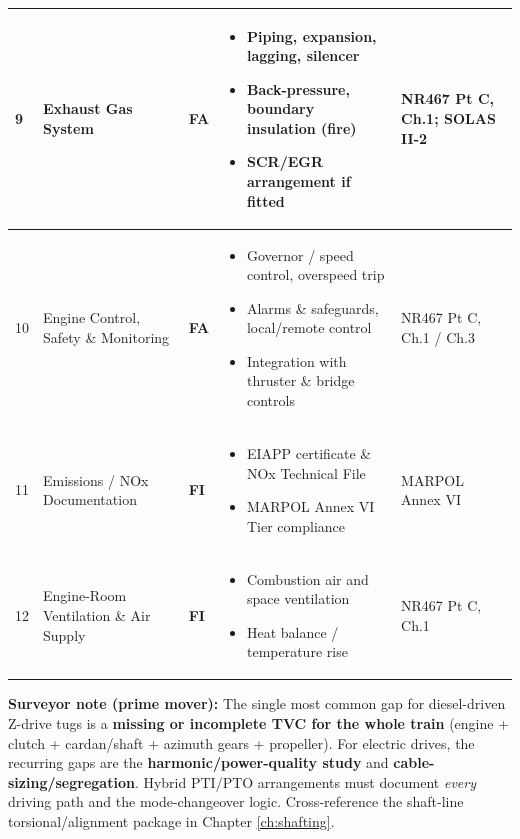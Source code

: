 \documentclass[11pt,a4paper]{report}
\newcommand{\fa}{\textbf{\textcolor{warningred}{FA}}}
\newcommand{\fic}{\textbf{\textcolor{bvgray}{FI}}}
\begin{document}
\begin{longtable}{|p{0.5cm}|p{5cm}|p{1.5cm}|p{5.5cm}|p{2cm}|}
9 & Exhaust Gas System & \fa{} &
\begin{itemize}[leftmargin=*,nosep]
\item Piping, expansion, lagging, silencer
\item Back-pressure, boundary insulation (fire)
\item SCR/EGR arrangement if fitted
\end{itemize} & NR467 Pt C, Ch.1; SOLAS II-2 \\
\hline

10 & Engine Control, Safety \& Monitoring & \fa{} &
\begin{itemize}[leftmargin=*,nosep]
\item Governor / speed control, overspeed trip
\item Alarms \& safeguards, local/remote control
\item Integration with thruster \& bridge controls
\end{itemize} & NR467 Pt C, Ch.1 / Ch.3 \\
\hline

11 & Emissions / NOx Documentation & \fic{} &
\begin{itemize}[leftmargin=*,nosep]
\item EIAPP certificate \& NOx Technical File
\item MARPOL Annex VI Tier compliance
\end{itemize} & MARPOL Annex VI \\
\hline

12 & Engine-Room Ventilation \& Air Supply & \fic{} &
\begin{itemize}[leftmargin=*,nosep]
\item Combustion air and space ventilation
\item Heat balance / temperature rise
\end{itemize} & NR467 Pt C, Ch.1 \\
\hline

\end{longtable}

\noindent\textbf{Surveyor note (prime mover):} The single most common gap for
diesel-driven Z-drive tugs is a \textbf{missing or incomplete TVC for the whole
train} (engine + clutch + cardan/shaft + azimuth gears + propeller). For
electric drives, the recurring gaps are the \textbf{harmonic/power-quality study}
and \textbf{cable-sizing/segregation}. Hybrid PTI/PTO arrangements must document
\emph{every} driving path and the mode-changeover logic. Cross-reference the
shaft-line torsional/alignment package in Chapter \ref{ch:shafting}.
\end{document}
